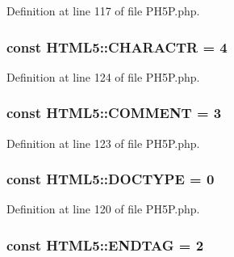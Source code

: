 Definition at line 117 of file P\+H5\+P.\+php.

\hypertarget{classHTML5_a19976cfde8e4bbf3fe516cc44cb0baf4}{
\subsubsection[{C\+H\+A\+R\+A\+C\+T\+R}]{\setlength{\rightskip}{0pt plus 5cm}const H\+T\+M\+L5\+::\+C\+H\+A\+R\+A\+C\+T\+R = 4}}\label{classHTML5_a19976cfde8e4bbf3fe516cc44cb0baf4}


Definition at line 124 of file P\+H5\+P.\+php.

\hypertarget{classHTML5_a524946c9d8a275b583b50b4342f00a99}{
\subsubsection[{C\+O\+M\+M\+E\+N\+T}]{\setlength{\rightskip}{0pt plus 5cm}const H\+T\+M\+L5\+::\+C\+O\+M\+M\+E\+N\+T = 3}}\label{classHTML5_a524946c9d8a275b583b50b4342f00a99}


Definition at line 123 of file P\+H5\+P.\+php.

\hypertarget{classHTML5_a9b83432e009926311f6ccf80412bf1cf}{
\subsubsection[{D\+O\+C\+T\+Y\+P\+E}]{\setlength{\rightskip}{0pt plus 5cm}const H\+T\+M\+L5\+::\+D\+O\+C\+T\+Y\+P\+E = 0}}\label{classHTML5_a9b83432e009926311f6ccf80412bf1cf}


Definition at line 120 of file P\+H5\+P.\+php.

\hypertarget{classHTML5_abdb3e01603102e86b3183fcd6c844e17}{
\subsubsection[{E\+N\+D\+T\+A\+G}]{\setlength{\rightskip}{0pt plus 5cm}const H\+T\+M\+L5\+::\+E\+N\+D\+T\+A\+G = 2}}\label{classHTML5_abdb3e01603102e86b3183fcd6c844e17}


